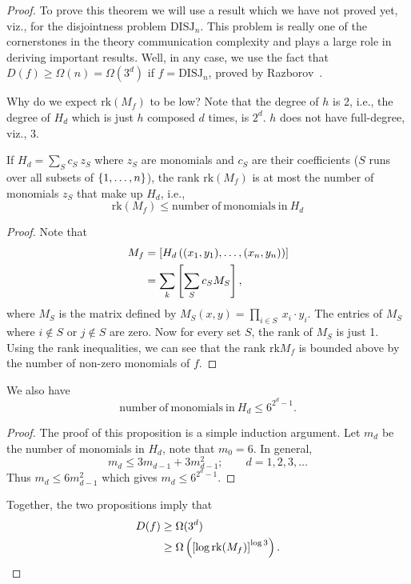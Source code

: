 \documentclass[letterpaper]{article}
\providecommand\rbrac[1]{\ensuremath \left(#1\right)}
\providecommand\sqbrac[1]{\ensuremath \left[#1\right]}
\providecommand\cbrac[1]{\ensuremath \left\{#1\right\}}
\newcommand{\rk}{\mathrm{rk}}
\newcommand{\mf}{M_f}
\newcommand{\df}{D(f)}
\newcommand{\DISJ}{\mathrm{DISJ}}
\begin{document}
\begin{proof}
To prove this theorem we will use a result which we have not proved yet, viz., for the disjointness problem $\DISJ_n$. This problem is really one of the cornerstones in the theory communication complexity and plays a large role in deriving important results. Well, in any case, we use the fact that $\df \geq \Omega(n) = \Omega(3^d)$ if $f = \DISJ_n$, proved by Razborov~\cite{razborov1992distributional}.

Why do we expect $\rk (\mf)$ to be low? Note that the degree of $h$ is 2, i.e., the degree of $H_d$ which is just $h$ composed $d$ times, is $2^d$. $h$ does not have full-degree, viz., 3.

\begin{proposition}
If $H_d = \sum_S c_S\ z_S$ where $z_S$ are monomials and $c_S$ are their coefficients ($S$ runs over all subsets of $\cbrac{1, \ldots, n}$), the rank $\rk (\mf)$ is at most the number of monomials $z_S$ that make up $H_d$, i.e.,
$$
\rk (\mf) \leq \mathrm{number\ of\ monomials\ in}\ H_d
$$
\end{proposition}
\begin{proof}
Note that
\begin{align*}
    \mf &= \sqbrac{H_d \rbrac{(x_1, y_1), \ldots, (x_n, y_n)}}\\
    &= \sum_k \sqbrac{\sum_S c_S M_S},
\end{align*}
where $M_S$ is the matrix defined by $M_S(x,y) = \prod_{i \in S}\ x_i \cdot y_i$. The entries of $M_S$ where $i \notin S$ or $j \notin S$ are zero. Now for every set $S$, the rank of $M_S$ is just 1. Using the rank inequalities, we can see that the rank $\rk \mf$ is bounded above by the number of non-zero monomials of $f$.
\end{proof}

\begin{proposition}
We also have 
$$
\mathrm{number\ of\ monomials\ in}\ H_d \leq 6^{2^d -1}.
$$
\end{proposition}
\begin{proof}
The proof of this proposition is a simple induction argument. Let $m_d$ be the number of monomials in $H_d$, note that $m_0 = 6$. In general,
$$
m_d \leq 3 m_{d-1} + 3 m_{d-1}^2; \qquad d = 1, 2, 3, \ldots
$$
Thus $m_d \leq 6 m_{d-1}^2$ which gives $m_d \leq 6^{2^d - 1}$.
\end{proof}

Together, the two propositions imply that
\begin{align*}
\df &\geq \Omega(3^d)\\
& \geq \Omega \rbrac{\sqbrac{\log \rk (\mf)}^{\log 3} }.
\end{align*}
\end{proof}
\end{document}
